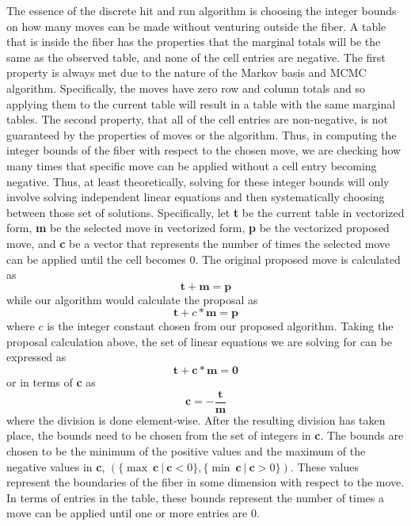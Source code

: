 \documentclass{phd}\usepackage[]{graphicx}\usepackage[]{color}
\begin{document}
The essence of the discrete hit and run algorithm is choosing the integer bounds on how many moves can be made without venturing outside the fiber. A table that is inside the fiber has the properties that the marginal totals will be the same as the observed table, and none of the cell entries are negative. The first property is always met due to the nature of the Markov basis and MCMC algorithm. Specifically, the moves have zero row and column totals and so applying them to the current table will result in a table with the same marginal tables. The second property, that all of the cell entries are non-negative, is not guaranteed by the properties of moves or the algorithm. Thus, in computing the integer bounds of the fiber with respect to the chosen move, we are checking how many times that specific move can be applied without a cell entry becoming negative. Thus, at least theoretically, solving for these integer bounds will only involve solving independent linear equations and then systematically choosing between those set of solutions. Specifically, let \textbf{t} be the current table in vectorized form, \textbf{m} be the selected move in vectorized form, \textbf{p} be the vectorized proposed move, and \textbf{c} be a vector that represents the number of times the selected move can be applied until the cell becomes 0. The original proposed move is calculated as $$\textbf{t} + \textbf{m} = \textbf{p}$$ while our algorithm would calculate the proposal as $$\textbf{t} + c * \textbf{m} = \textbf{p}$$ where $c$ is the integer constant chosen from our proposed algorithm. Taking the proposal calculation above, the set of linear equations we are solving for can be expressed as $$\textbf{t} + \textbf{c} * \textbf{m} = \mathbf{0}$$ or in terms of \textbf{c} as $$\textbf{c} = -\frac{\textbf{t}}{\textbf{m}}$$ where the division is done element-wise. After the resulting division has taken place, the bounds need to be chosen from the set of integers in \textbf{c}. The bounds are chosen to be the minimum of the positive values and the maximum of the negative values in \textbf{c}, $(\{ \max ~\textbf{c} ~|~ \textbf{c} < 0\} , \{ \min ~\textbf{c} ~|~ \textbf{c} > 0\})$. These values represent the boundaries of the fiber in some dimension with respect to the move. In terms of entries in the table, these bounds represent the number of times a move can be applied until one or more entries are 0. 
\end{document}
